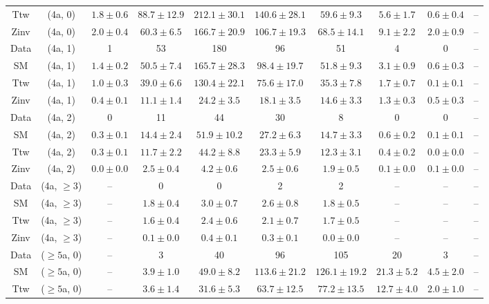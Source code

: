 \begin{table}[h!]
{\begin{tabular}{cccccccccc}
	Ttw & (4a, 0) & $1.8\pm 0.6$ & $88.7\pm 12.9$ & $212.1\pm 30.1$ & $140.6\pm 28.1$ & $59.6\pm 9.3$ & $5.6\pm 1.7$ & $0.6\pm 0.4$ & -- \\[0.5ex] 
	Zinv & (4a, 0) & $2.0\pm 0.4$ & $60.3\pm 6.5$ & $166.7\pm 20.9$ & $106.7\pm 19.3$ & $68.5\pm 14.1$ & $9.1\pm 2.2$ & $2.0\pm 0.9$ & -- \\[0.5ex] 
	Data & (4a, 1) & 1 & 53 & 180 & 96 & 51 & 4 & 0 & -- \\[0.5ex] 
	SM & (4a, 1) & $1.4\pm 0.2$ & $50.5\pm 7.4$ & $165.7\pm 28.3$ & $98.4\pm 19.7$ & $51.8\pm 9.3$ & $3.1\pm 0.9$ & $0.6\pm 0.3$ & -- \\[0.5ex] 
	Ttw & (4a, 1) & $1.0\pm 0.3$ & $39.0\pm 6.6$ & $130.4\pm 22.1$ & $75.6\pm 17.0$ & $35.3\pm 7.8$ & $1.7\pm 0.7$ & $0.1\pm 0.1$ & -- \\[0.5ex] 
	Zinv & (4a, 1) & $0.4\pm 0.1$ & $11.1\pm 1.4$ & $24.2\pm 3.5$ & $18.1\pm 3.5$ & $14.6\pm 3.3$ & $1.3\pm 0.3$ & $0.5\pm 0.3$ & -- \\[0.5ex] 
	Data & (4a, 2) & 0 & 11 & 44 & 30 & 8 & 0 & 0 & -- \\[0.5ex] 
	SM & (4a, 2) & $0.3\pm 0.1$ & $14.4\pm 2.4$ & $51.9\pm 10.2$ & $27.2\pm 6.3$ & $14.7\pm 3.3$ & $0.6\pm 0.2$ & $0.1\pm 0.1$ & -- \\[0.5ex] 
	Ttw & (4a, 2) & $0.3\pm 0.1$ & $11.7\pm 2.2$ & $44.2\pm 8.8$ & $23.3\pm 5.9$ & $12.3\pm 3.1$ & $0.4\pm 0.2$ & $0.0\pm 0.0$ & -- \\[0.5ex] 
	Zinv & (4a, 2) & $0.0\pm 0.0$ & $2.5\pm 0.4$ & $4.2\pm 0.6$ & $2.5\pm 0.6$ & $1.9\pm 0.5$ & $0.1\pm 0.0$ & $0.1\pm 0.0$ & -- \\[0.5ex] 
	Data & (4a, $\ge3$) & -- & 0 & 0 & 2 & 2 & -- & -- & -- \\[0.5ex] 
	SM & (4a, $\ge3$) & -- & $1.8\pm 0.4$ & $3.0\pm 0.7$ & $2.6\pm 0.8$ & $1.8\pm 0.5$ & -- & -- & -- \\[0.5ex] 
	Ttw & (4a, $\ge3$) & -- & $1.6\pm 0.4$ & $2.4\pm 0.6$ & $2.1\pm 0.7$ & $1.7\pm 0.5$ & -- & -- & -- \\[0.5ex] 
	Zinv & (4a, $\ge3$) & -- & $0.1\pm 0.0$ & $0.4\pm 0.1$ & $0.3\pm 0.1$ & $0.0\pm 0.0$ & -- & -- & -- \\[0.5ex] 
	Data & ($\ge5$a, 0) & -- & 3 & 40 & 96 & 105 & 20 & 3 & -- \\[0.5ex] 
	SM & ($\ge5$a, 0) & -- & $3.9\pm 1.0$ & $49.0\pm 8.2$ & $113.6\pm 21.2$ & $126.1\pm 19.2$ & $21.3\pm 5.2$ & $4.5\pm 2.0$ & -- \\[0.5ex] 
	Ttw & ($\ge5$a, 0) & -- & $3.6\pm 1.4$ & $31.6\pm 5.3$ & $63.7\pm 12.5$ & $77.2\pm 13.5$ & $12.7\pm 4.0$ & $2.0\pm 1.0$ & -- \\[0.5ex] 

\end{tabular}}
\end{table}

